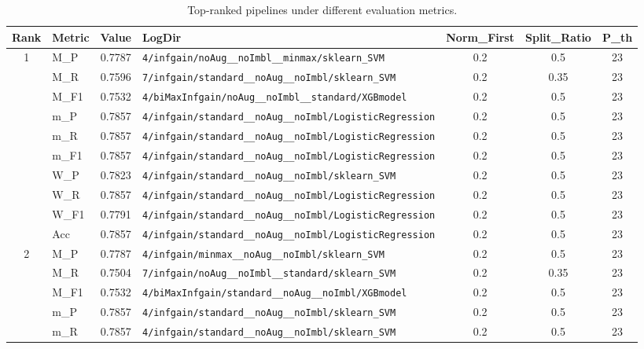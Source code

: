 \begin{table}[htbp]
\caption{Top-ranked pipelines under different evaluation metrics.}
\label{tab:rank_metric_vertical}
\centering
\small
\setlength{\tabcolsep}{4pt}
\begin{tabular}{|c|l|c|>{\ttfamily\footnotesize}p{7.2cm}|c|c|c|}
\hline
Rank & Metric & Value & LogDir & Norm\_First & Split\_Ratio & P\_th \\
\hline
\multirow{10}{*}{1} & M\_P & 0.7787 & \texttt{4/infgain/noAug\_\_noImbl\_\_minmax/sklearn\_SVM} & 0.2 & 0.5  & 23 \\ 
 & M\_R & 0.7596 & \texttt{7/infgain/standard\_\_noAug\_\_noImbl/sklearn\_SVM} & 0.2 & 0.35  & 23 \\ 
 & M\_F1 & 0.7532 & \texttt{4/biMaxInfgain/noAug\_\_noImbl\_\_standard/XGBmodel} & 0.2 & 0.5  & 23 \\ 
 & m\_P & 0.7857 & \texttt{4/infgain/standard\_\_noAug\_\_noImbl/LogisticRegression} & 0.2 & 0.5  & 23 \\ 
 & m\_R & 0.7857 & \texttt{4/infgain/standard\_\_noAug\_\_noImbl/LogisticRegression} & 0.2 & 0.5  & 23 \\ 
 & m\_F1 & 0.7857 & \texttt{4/infgain/standard\_\_noAug\_\_noImbl/LogisticRegression} & 0.2 & 0.5  & 23 \\ 
 & W\_P & 0.7823 & \texttt{4/infgain/standard\_\_noAug\_\_noImbl/sklearn\_SVM} & 0.2 & 0.5  & 23 \\ 
 & W\_R & 0.7857 & \texttt{4/infgain/standard\_\_noAug\_\_noImbl/LogisticRegression} & 0.2 & 0.5  & 23 \\ 
 & W\_F1 & 0.7791 & \texttt{4/infgain/standard\_\_noAug\_\_noImbl/LogisticRegression} & 0.2 & 0.5  & 23 \\ 
 & Acc & 0.7857 & \texttt{4/infgain/standard\_\_noAug\_\_noImbl/LogisticRegression} & 0.2 & 0.5  & 23 \\ 
\hline
\multirow{10}{*}{2} & M\_P & 0.7787 & \texttt{4/infgain/minmax\_\_noAug\_\_noImbl/sklearn\_SVM} & 0.2 & 0.5  & 23 \\ 
 & M\_R & 0.7504 & \texttt{7/infgain/noAug\_\_noImbl\_\_standard/sklearn\_SVM} & 0.2 & 0.35  & 23 \\ 
 & M\_F1 & 0.7532 & \texttt{4/biMaxInfgain/standard\_\_noAug\_\_noImbl/XGBmodel} & 0.2 & 0.5  & 23 \\ 
 & m\_P & 0.7857 & \texttt{4/infgain/standard\_\_noAug\_\_noImbl/sklearn\_SVM} & 0.2 & 0.5  & 23 \\ 
 & m\_R & 0.7857 & \texttt{4/infgain/standard\_\_noAug\_\_noImbl/sklearn\_SVM} & 0.2 & 0.5  & 23 \\ 

\end{tabular}
\end{table}
